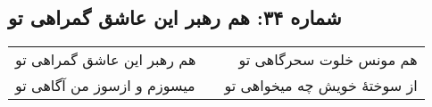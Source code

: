 \begin{center}
\section*{شماره ۳۴: هم رهبر این عاشق گمراهی تو}
\label{sec:034}
\begin{longtable}{l p{0.5cm} r}
هم رهبر این عاشق گمراهی تو
&&
هم مونس خلوت سحرگاهی تو
\\
میسوزم و ازسوز من آگاهی تو
&&
از سوختهٔ خویش چه میخواهی تو
\\
\end{longtable}
\end{center}
